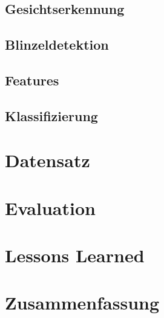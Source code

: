 \documentclass[12pt,ngerman,seminar]{dbvstudentwork}
\begin{document}
\subsection{Gesichtserkennung}
\label{sec:facedetection}

\subsection{Blinzeldetektion}
\label{sec:blinkdetection}

\subsection{Features}
\label{sec:features}

\subsection{Klassifizierung}
\label{sec:classification}

\section{Datensatz}
\label{sec:dataset}

\section{Evaluation}
\label{sec:evaluation}

\section{Lessons Learned}
\label{sec:lessonslearned}

\section{Zusammenfassung}
\label{sec:summary}



  \singlespacing

  \clearpage
  
  \clearpage
  \listoffigures %
  \clearpage
\end{document}
